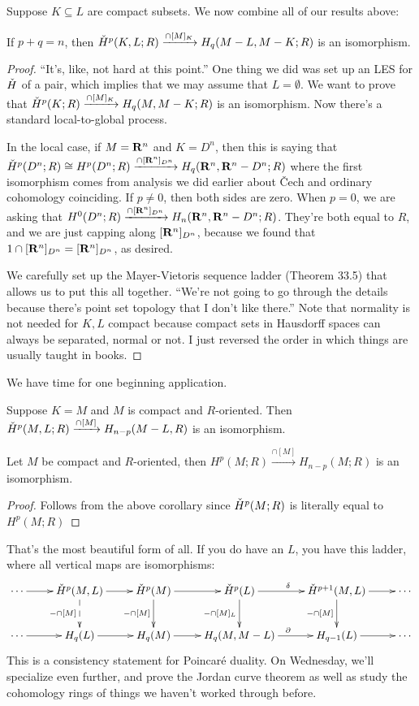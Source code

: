 Suppose $K\subseteq L$ are compact subsets. We now combine all of our results above:
\begin{theorem}
If $p+q=n$, then $\check{H}^p(K,L;R)\xrightarrow{\cap[M]_K}H_q(M-L,M-K;R)$ is an isomorphism.
\end{theorem}
\begin{proof}
``It's, like, not hard at this point.'' One thing we did was set up an LES for $\check{H}$ of a pair, which implies that we may assume that $L=\emptyset$. We want to prove that $\check{H}^p(K;R)\xrightarrow{\cap[M]_K}H_q(M,M-K;R)$ is an isomorphism. Now there's a standard local-to-global process.

In the local case, if $M=\mathbf R^n$ and $K=D^n$, then this is saying that $\check{H}^p(D^n;R)\cong H^p(D^n;R)\xrightarrow{\cap[\mathbf R^n]_{D^n}}H_q(\mathbf R^n,\mathbf R^n-D^n;R)$ where the first isomorphism comes from analysis we did earlier about \v{C}ech and ordinary cohomology coinciding. If $p\neq 0$, then both sides are zero. When $p=0$, we are asking that $H^0(D^n;R)\xrightarrow{\cap[\mathbf R^n]_{D^n}}H_n(\mathbf R^n,\mathbf R^n-D^n;R)$. They're both equal to $R$, and we are just capping along $[\mathbf R^n]_{D^n}$, because we found that $1\cap[\mathbf R^n]_{D^n}=[\mathbf R^n]_{D^n}$, as desired.

We carefully set up the Mayer-Vietoris sequence ladder (Theorem 33.5) that allows us to put this all together. ``We're not going to go through the details because there's point set topology that I don't like there.'' Note that normality is not needed for $K,L$ compact because compact sets in Hausdorff spaces can always be separated, normal or not. I just reversed the order in which things are usually taught in books.
\end{proof}
We have time for one beginning application.
\begin{corollary}
Suppose $K=M$ and $M$ is compact and $R$-oriented. Then $\check{H}^p(M,L;R)\xrightarrow{\cap[M]}H_{n-p}(M-L,R)$ is an isomorphism.
\end{corollary}
\begin{corollary}
Let $M$ be compact and $R$-oriented, then $H^p(M;R)\xrightarrow{\cap [M]}H_{n-p}(M;R)$ is an isomorphism.
\end{corollary}
\begin{proof}
Follows from the above corollary since $\check{H}^p(M;R)$ is literally equal to $H^p(M;R)$
\end{proof}
That's the most beautiful form of all. If you do have an $L$, you have this ladder, where all vertical maps are isomorphisms:
\begin{equation*}
\xymatrix{
	\cdots\ar[r] & \cHH^p(M,L)\ar[r]\ar@{-->}[d]_{-\cap [M]} & \cHH^p(M)\ar[r]\ar[d]_{-\cap [M]} & \cHH^p(L)\ar[r]^\delta\ar[d]_{-\cap [M]_L} & \cHH^{p+1}(M,L)\ar[r]\ar[d]_{-\cap [M]} & \cdots\\
	\cdots\ar[r] & H_q(L)\ar[r]& H_q(M)\ar[r] & H_q(M,M-L)\ar[r]^\partial & H_{q-1}(L)\ar[r] & \cdots
}
\end{equation*}
This is a consistency statement for Poincar\'e duality. On Wednesday, we'll specialize even further, and prove the Jordan curve theorem as well as study the cohomology rings of things we haven't worked through before.
